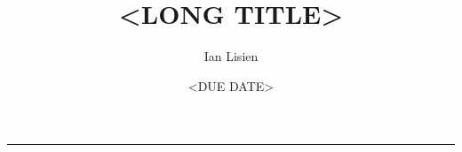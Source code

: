 \documentclass{article}
\title{<LONG TITLE>}
\author{Ian Lisien}
\date{<DUE DATE>}
\newcommand{\fullbarline}{\noindent\rule{\textwidth}{0.4pt}}
\begin{document}
\maketitle

\fullbarline


\printbibliography
\end{document}
